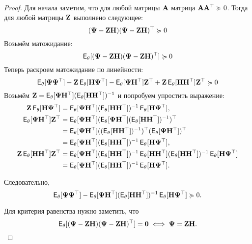 \begin{proof}
	Для начала заметим, что для любой матрицы $\mathbf{A}$ матрица $\mathbf{A}\mathbf{A}^{\top} \succcurlyeq 0$. Тогда для любой матрицы $\mathbf{Z}$ выполнено следующее:
	\[
		(\mathbf{\Psi} - \mathbf{Z}\mathbf{H})(\mathbf{\Psi} - \mathbf{Z}\mathbf{H})^{\top} \succcurlyeq 0
	\]
	Возьмём матожидание:
	\[
		\operatorname{\mathsf{E}}_{\theta}[(\mathbf{\Psi} - \mathbf{Z}\mathbf{H})(\mathbf{\Psi} - \mathbf{Z}\mathbf{H})^{\top}] \succcurlyeq 0
	\]
	Теперь раскроем матожидание по линейности:
	\[
		\operatorname{\mathsf{E}}_{\theta}[\mathbf{\Psi}\mathbf{\Psi}^{\top}] - \mathbf{Z}\operatorname{\mathsf{E}}_{\theta}[\mathbf{H}\mathbf{\Psi}^{\top}] - \operatorname{\mathsf{E}}_{\theta}[\mathbf{\Psi}\mathbf{H}^{\top}]\mathbf{Z}^{\top} + \mathbf{Z}\operatorname{\mathsf{E}}_{\theta}[\mathbf{H}\mathbf{H}^{\top}]\mathbf{Z}^{\top} \succcurlyeq 0
	\]
	Возьмём $\mathbf{Z} = \operatorname{\mathsf{E}}_{\theta}[\mathbf{\Psi}\mathbf{H}^{\top}] (\operatorname{\mathsf{E}}_{\theta}[\mathbf{H}\mathbf{H}^{\top}])^{-1}$ и попробуем упростить выражение:
	\begin{align*}
		\mathbf{Z}\operatorname{\mathsf{E}}_{\theta}[\mathbf{H}\mathbf{\Psi}^{\top}]
		&= \operatorname{\mathsf{E}}_{\theta}[\mathbf{\Psi}\mathbf{H}^{\top}] (\operatorname{\mathsf{E}}_{\theta}[\mathbf{H}\mathbf{H}^{\top}])^{-1} \operatorname{\mathsf{E}}_{\theta}[\mathbf{H}\mathbf{\Psi}^{\top}], \\
		\operatorname{\mathsf{E}}_{\theta}[\mathbf{\Psi}\mathbf{H}^{\top}]\mathbf{Z}^{\top}
		&= \operatorname{\mathsf{E}}_{\theta}[\mathbf{\Psi}\mathbf{H}^{\top}] (\operatorname{\mathsf{E}}_{\theta}[\mathbf{\Psi}\mathbf{H}^{\top}] (\operatorname{\mathsf{E}}_{\theta}[\mathbf{H}\mathbf{H}^{\top}])^{-1})^{\top} \\
		&= \operatorname{\mathsf{E}}_{\theta}[\mathbf{\Psi}\mathbf{H}^{\top}] ((\operatorname{\mathsf{E}}_{\theta}[\mathbf{H}\mathbf{H}^{\top}])^{-1})^{\top} (\operatorname{\mathsf{E}}_{\theta}[\mathbf{\Psi}\mathbf{H}^{\top}])^{\top} \\
		&= \operatorname{\mathsf{E}}_{\theta}[\mathbf{\Psi}\mathbf{H}^{\top}] (\operatorname{\mathsf{E}}_{\theta}[\mathbf{H}\mathbf{H}^{\top}])^{-1} \operatorname{\mathsf{E}}_{\theta}[\mathbf{H}\mathbf{\Psi}^{\top}], \\
		\mathbf{Z}\operatorname{\mathsf{E}}_{\theta}[\mathbf{H}\mathbf{H}^{\top}]\mathbf{Z}^{\top}
		&= \operatorname{\mathsf{E}}_{\theta}[\mathbf{\Psi}\mathbf{H}^{\top}] (\operatorname{\mathsf{E}}_{\theta}[\mathbf{H}\mathbf{H}^{\top}])^{-1} \operatorname{\mathsf{E}}_{\theta}[\mathbf{H}\mathbf{H}^{\top}] (\operatorname{\mathsf{E}}_{\theta}[\mathbf{H}\mathbf{H}^{\top}])^{-1} \operatorname{\mathsf{E}}_{\theta}[\mathbf{H}\mathbf{\Psi}^{\top}] \\
		&= \operatorname{\mathsf{E}}_{\theta}[\mathbf{\Psi}\mathbf{H}^{\top}] (\operatorname{\mathsf{E}}_{\theta}[\mathbf{H}\mathbf{H}^{\top}])^{-1} \operatorname{\mathsf{E}}_{\theta}[\mathbf{H}\mathbf{\Psi}^{\top}].
	\end{align*}
	
	Следовательно,
	\[
		\operatorname{\mathsf{E}}_{\theta}[\mathbf{\Psi}\mathbf{\Psi}^{\top}] - \operatorname{\mathsf{E}}_{\theta}[\mathbf{\Psi}\mathbf{H}^{\top}] (\operatorname{\mathsf{E}}_{\theta}[\mathbf{H}\mathbf{H}^{\top}])^{-1} \operatorname{\mathsf{E}}_{\theta}[\mathbf{H}\mathbf{\Psi}^{\top}] \succcurlyeq 0.
	\]
	
	Для критерия равенства нужно заметить, что
	\[
		\operatorname{\mathsf{E}}_{\theta}[(\mathbf{\Psi} - \mathbf{Z}\mathbf{H})(\mathbf{\Psi} - \mathbf{Z}\mathbf{H})^{\top}] = \mathbf{0} \iff \mathbf{\Psi} = \mathbf{Z}\mathbf{H}. \qedhere
	\]
\end{proof}

